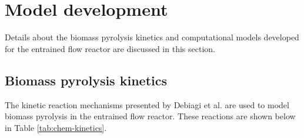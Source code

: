 
\section{Model development}

Details about the biomass pyrolysis kinetics and computational models developed for the entrained flow reactor are discussed in this section.

\subsection{Biomass pyrolysis kinetics}

The kinetic reaction mechanisms presented by Debiagi et al. are used to model biomass pyrolysis in the entrained flow reactor. These reactions are shown below in Table \ref{tab:chem-kinetics}.

